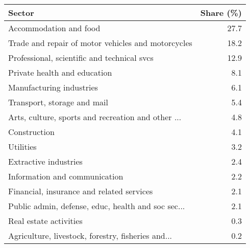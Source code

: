 \begin{tabular}{lr}
\toprule
                                            Sector &  Share (\%) \\
\midrule
                            Accommodation and food &       27.7 \\
Trade and repair of motor vehicles and motorcycles &       18.2 \\
       Professional, scientific and technical svcs &       12.9 \\
                      Private health and education &        8.1 \\
                          Manufacturing industries &        6.1 \\
                       Transport, storage and mail &        5.4 \\
Arts, culture, sports and recreation and other ... &        4.8 \\
                                      Construction &        4.1 \\
                                         Utilities &        3.2 \\
                             Extractive industries &        2.4 \\
                     Information and communication &        2.2 \\
         Financial, insurance and related services &        2.1 \\
Public admin, defense, educ, health and soc sec... &        2.1 \\
                            Real estate activities &        0.3 \\
Agriculture, livestock, forestry, fisheries and... &        0.2 \\
\bottomrule
\end{tabular}

